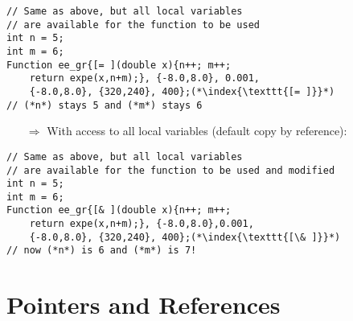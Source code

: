\documentclass[10pt]{book}
\begin{document}
\begin{lstlisting}
// Same as above, but all local variables
// are available for the function to be used
int n = 5;
int m = 6;
Function ee_gr{[= ](double x){n++; m++; 
    return expe(x,n+m);}, {-8.0,8.0}, 0.001,
    {-8.0,8.0}, {320,240}, 400};(*\index{\texttt{[= ]}}*)
// (*n*) stays 5 and (*m*) stays 6 
 \end{lstlisting}
\begin{enumerate}
\item[$\Rightarrow$] With access to all local variables (default copy by reference):
\end{enumerate}
\begin{lstlisting}
// Same as above, but all local variables
// are available for the function to be used and modified
int n = 5;
int m = 6;
Function ee_gr{[& ](double x){n++; m++;
    return expe(x,n+m);}, {-8.0,8.0},0.001,
    {-8.0,8.0}, {320,240}, 400};(*\index{\texttt{[\& ]}}*)
// now (*n*) is 6 and (*m*) is 7!
 \end{lstlisting}
%
%
\chapter{Pointers and References}
%
%
\end{document}
